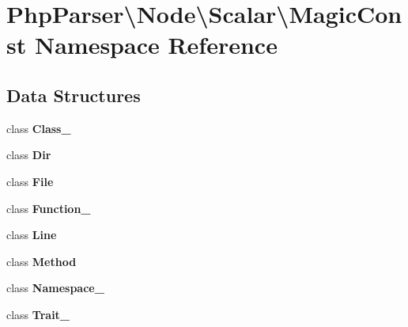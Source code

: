 \section{Php\+Parser\textbackslash{}Node\textbackslash{}Scalar\textbackslash{}Magic\+Const Namespace Reference}
\label{namespace_php_parser_1_1_node_1_1_scalar_1_1_magic_const}
\subsection*{Data Structures}
\begin{DoxyCompactItemize}
\item 
class {\bf Class\+\_\+}
\item 
class {\bf Dir}
\item 
class {\bf File}
\item 
class {\bf Function\+\_\+}
\item 
class {\bf Line}
\item 
class {\bf Method}
\item 
class {\bf Namespace\+\_\+}
\item 
class {\bf Trait\+\_\+}
\end{DoxyCompactItemize}
